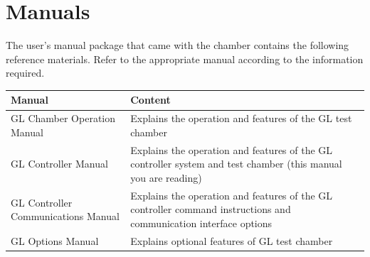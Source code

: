 \section{Manuals}

The user's manual package that came with the chamber contains the
following reference materials. Refer to the appropriate manual according
to the information required.

\begin{longtable}[]{@{}ll@{}}
\toprule
\begin{minipage}[b]{0.28\columnwidth}\raggedright
Manual\strut
\end{minipage} & \begin{minipage}[b]{0.66\columnwidth}\raggedright
Content\strut
\end{minipage}\tabularnewline
\midrule
\endhead
\begin{minipage}[t]{0.28\columnwidth}\raggedright
GL Chamber Operation Manual\strut
\end{minipage} & \begin{minipage}[t]{0.66\columnwidth}\raggedright
Explains the operation and features of the GL test chamber\strut
\end{minipage}\tabularnewline
\begin{minipage}[t]{0.28\columnwidth}\raggedright
GL Controller Manual\strut
\end{minipage} & \begin{minipage}[t]{0.66\columnwidth}\raggedright
Explains the operation and features of the GL controller system and test
chamber (this manual you are reading)\strut
\end{minipage}\tabularnewline
\begin{minipage}[t]{0.28\columnwidth}\raggedright
GL Controller Communications Manual\strut
\end{minipage} & \begin{minipage}[t]{0.66\columnwidth}\raggedright
Explains the operation and features of the GL controller command
instructions and communication interface options\strut
\end{minipage}\tabularnewline
\begin{minipage}[t]{0.28\columnwidth}\raggedright
GL Options Manual\strut
\end{minipage} & \begin{minipage}[t]{0.66\columnwidth}\raggedright
Explains optional features of GL test chamber\strut
\end{minipage}\tabularnewline
\bottomrule
\end{longtable}


